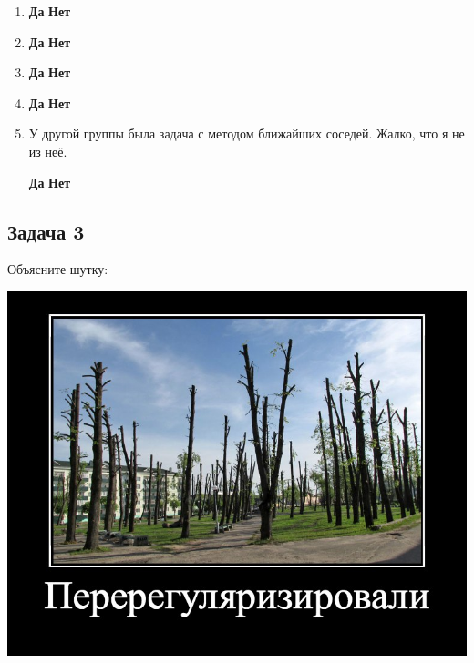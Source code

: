 \documentclass[12pt, a4paper, oneside]{article}
\begin{document}
\begin{enumerate}
	\item 
	
	\hspace{2cm} \textbf{Да}  \hspace{4cm} \textbf{Нет} 
	
	\item
	
	\hspace{2cm} \textbf{Да}  \hspace{4cm} \textbf{Нет} 
	
	\item
	
	\hspace{2cm} \textbf{Да}  \hspace{4cm} \textbf{Нет} 
	
	\item 
	
	\hspace{2cm} \textbf{Да}  \hspace{4cm} \textbf{Нет} 
	
	\item У другой группы была задача с методом ближайших соседей. Жалко, что я не из неё.
		
	\hspace{2cm} \textbf{Да}  \hspace{4cm} \textbf{Нет} 
	
\end{enumerate}




\subsection*{Задача 3}

Объясните шутку: 

\begin{center}
	\includegraphics[scale=0.5]{memes3.jpg}
\end{center}
\end{document}
